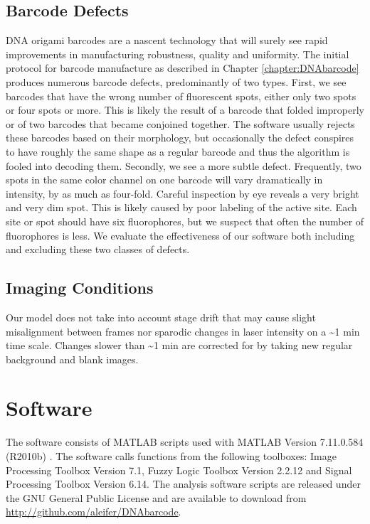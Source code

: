 \subsection{Barcode Defects}\label{sec:defects}
DNA origami barcodes are a nascent technology that will surely see rapid improvements in manufacturing robustness, quality and uniformity. The initial protocol for barcode manufacture as described in Chapter \ref{chapter:DNAbarcode} produces numerous barcode defects, predominantly of two types. First, we see barcodes that have the wrong number of fluorescent spots, either only two spots or four spots or more. This is likely the result of a barcode that folded improperly or of two barcodes that became conjoined together. The software usually rejects these barcodes based on their morphology, but occasionally the defect conspires to have roughly the same shape as a regular barcode and thus the algorithm is fooled into decoding them. Secondly, we see a more subtle defect. Frequently, two spots in the same color channel on one barcode will vary dramatically in intensity, by as much as four-fold. Careful inspection by eye reveals a very bright and very dim spot. This is likely caused by poor labeling of the active site. Each site or spot should have six fluorophores, but we suspect that often the number of fluorophores is less. We evaluate the effectiveness of our software both including and excluding these two classes of defects.    


\subsection{Imaging Conditions}
Our model does not take into account stage drift that may cause slight misalignment between frames nor sparodic changes in laser intensity on a \textasciitilde1 min time scale. Changes slower than \textasciitilde1 min are corrected for by taking new regular background and blank images.
 
\section{Software}
The software consists of MATLAB scripts used with MATLAB Version 7.11.0.584 (R2010b) \citep{matlab_version_2010}. The software calls functions from the following toolboxes: Image Processing Toolbox Version 7.1, Fuzzy Logic Toolbox Version 2.2.12 and Signal Processing Toolbox Version 6.14. The analysis software scripts are released under the GNU General Public License and are available to download from \url{http://github.com/aleifer/DNAbarcode}.

